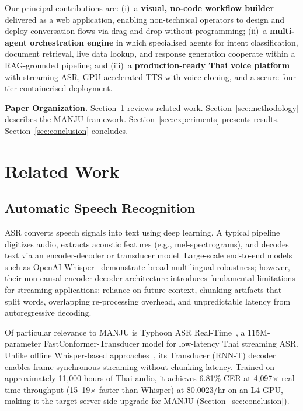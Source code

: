 \documentclass[10pt, a4paper, twocolumn]{article}
\begin{document}
Our principal contributions are:
(i)~a \textbf{visual, no-code workflow builder} delivered as a web application, enabling non-technical operators to design and deploy conversation flows via drag-and-drop without programming;
(ii)~a \textbf{multi-agent orchestration engine} in which specialised agents for intent classification, document retrieval, live data lookup, and response generation cooperate within a RAG-grounded pipeline; and
(iii)~a \textbf{production-ready Thai voice platform} with streaming ASR, GPU-accelerated TTS with voice cloning, and a secure four-tier containerised deployment.

\noindent\textbf{Paper Organization.}
Section~\ref{sec:related} reviews related work.
Section~\ref{sec:methodology} describes the MANJU framework.
Section~\ref{sec:experiments} presents results.
Section~\ref{sec:conclusion} concludes.

\section{Related Work}
\label{sec:related}

\subsection{Automatic Speech Recognition}
ASR converts speech signals into text using deep learning.
A typical pipeline digitizes audio, extracts acoustic features (e.g., mel-spectrograms), and decodes text via an encoder-decoder or transducer model.
Large-scale end-to-end models such as OpenAI Whisper~\cite{radford2022whisper} demonstrate broad multilingual robustness; however, their non-causal encoder-decoder architecture introduces fundamental limitations for streaming applications: reliance on future context, chunking artifacts that split words, overlapping re-processing overhead, and unpredictable latency from autoregressive decoding.

Of particular relevance to MANJU is Typhoon ASR Real-Time~\cite{sirichotedumrong2026typhoonasr}, a 115M-parameter FastConformer-Transducer model for low-latency Thai streaming ASR.
Unlike offline Whisper-based approaches~\cite{tipaksorn2024pathumma,aung2024thonburian}, its Transducer (RNN-T) decoder enables frame-synchronous streaming without chunking latency.
Trained on approximately 11{,}000 hours of Thai audio, it achieves 6.81\% CER at 4{,}097$\times$ real-time throughput (15--19$\times$ faster than Whisper) at \$0.0023/hr on an L4 GPU, making it the target server-side upgrade for MANJU (Section~\ref{sec:conclusion}).
\end{document}
